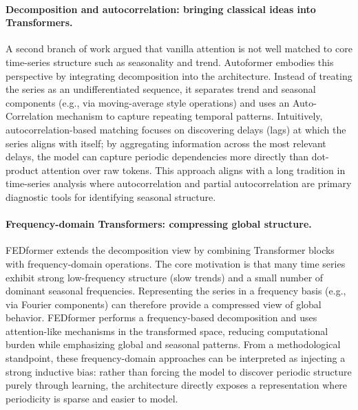 \paragraph{Decomposition and autocorrelation: bringing classical ideas into Transformers.}
A second branch of work argued that vanilla attention is not well matched to core time-series structure such as seasonality and trend. Autoformer embodies this perspective by integrating decomposition into the architecture. Instead of treating the series as an undifferentiated sequence, it separates trend and seasonal components (e.g., via moving-average style operations) and uses an Auto-Correlation mechanism to capture repeating temporal patterns. Intuitively, autocorrelation-based matching focuses on discovering delays (lags) at which the series aligns with itself; by aggregating information across the most relevant delays, the model can capture periodic dependencies more directly than dot-product attention over raw tokens. This approach aligns with a long tradition in time-series analysis where autocorrelation and partial autocorrelation are primary diagnostic tools for identifying seasonal structure.

\paragraph{Frequency-domain Transformers: compressing global structure.}
FEDformer extends the decomposition view by combining Transformer blocks with frequency-domain operations. The core motivation is that many time series exhibit strong low-frequency structure (slow trends) and a small number of dominant seasonal frequencies. Representing the series in a frequency basis (e.g., via Fourier components) can therefore provide a compressed view of global behavior. FEDformer performs a frequency-based decomposition and uses attention-like mechanisms in the transformed space, reducing computational burden while emphasizing global and seasonal patterns. From a methodological standpoint, these frequency-domain approaches can be interpreted as injecting a strong inductive bias: rather than forcing the model to discover periodic structure purely through learning, the architecture directly exposes a representation where periodicity is sparse and easier to model.

